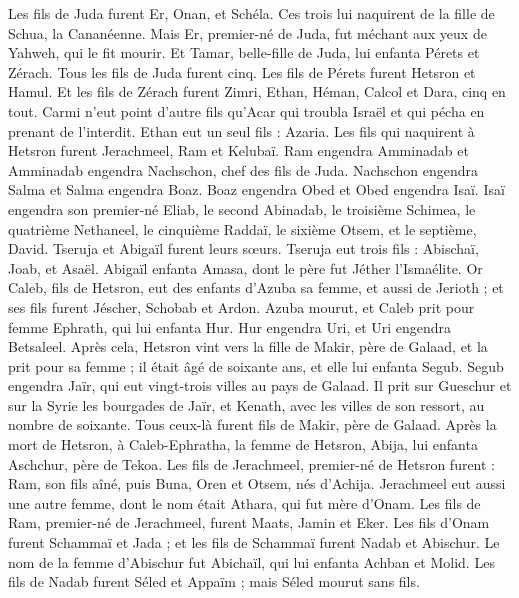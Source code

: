\begin{multicols}{2}
Les fils de Juda furent Er, Onan, et Schéla. Ces trois lui naquirent de la fille de Schua, la Cananéenne. Mais Er, premier-né de Juda, fut méchant aux yeux de Yahweh, qui le fit mourir.
Et Tamar, belle-fille de Juda, lui enfanta Pérets et Zérach. Tous les fils de Juda furent cinq.
Les fils de Pérets furent Hetsron et Hamul.
Et les fils de Zérach furent Zimri, Ethan, Héman, Calcol et Dara, cinq en tout.
Carmi n'eut point d'autre fils qu'Acar qui troubla Israël et qui pécha en prenant de l'interdit.
Ethan eut un seul fils : Azaria.
Les fils qui naquirent à Hetsron furent Jerachmeel, Ram et Kelubaï.
Ram engendra Amminadab et Amminadab engendra Nachschon, chef des fils de Juda.
Nachschon engendra Salma et Salma engendra Boaz.
Boaz engendra Obed et Obed engendra Isaï.
Isaï engendra son premier-né Eliab, le second Abinadab, le troisième Schimea,
le quatrième Nethaneel, le cinquième Raddaï,
le sixième Otsem, et le septième, David.
Tseruja et Abigaïl furent leurs sœurs. Tseruja eut trois fils : Abischaï, Joab, et Asaël.
Abigaïl enfanta Amasa, dont le père fut Jéther l'Ismaélite.
Or Caleb, fils de Hetsron, eut des enfants d'Azuba sa femme, et aussi de Jerioth ; et ses fils furent Jéscher, Schobab et Ardon.
Azuba mourut, et Caleb prit pour femme Ephrath, qui lui enfanta Hur.
Hur engendra Uri, et Uri engendra Betsaleel.
Après cela, Hetsron vint vers la fille de Makir, père de Galaad, et la prit pour sa femme ; il était âgé de soixante ans, et elle lui enfanta Segub.
Segub engendra Jaïr, qui eut vingt-trois villes au pays de Galaad.
Il prit sur Gueschur et sur la Syrie les bourgades de Jaïr, et Kenath, avec les villes de son ressort, au nombre de soixante. Tous ceux-là furent fils de Makir, père de Galaad.
Après la mort de Hetsron, à Caleb-Ephratha, la femme de Hetsron, Abija, lui enfanta Aschchur, père de Tekoa.
Les fils de Jerachmeel, premier-né de Hetsron furent : Ram, son fils aîné, puis Buna, Oren et Otsem, nés d'Achija.
Jerachmeel eut aussi une autre femme, dont le nom était Athara, qui fut mère d'Onam.
Les fils de Ram, premier-né de Jerachmeel, furent Maats, Jamin et Eker.
Les fils d'Onam furent Schammaï et Jada ; et les fils de Schammaï furent Nadab et Abischur.
Le nom de la femme d'Abischur fut Abichaïl, qui lui enfanta Achban et Molid.
Les fils de Nadab furent Séled et Appaïm ; mais Séled mourut sans fils.

\end{multicols}
